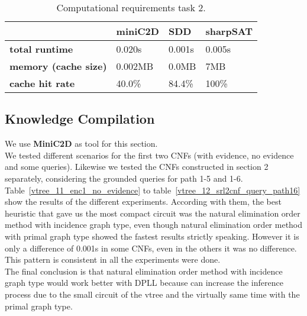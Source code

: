 \begin{table}[h]
	\centering
	\caption{Computational requirements task 2.}
	\label{table:comptask2}
	\begin{tabular}{l|l|l|l}
		\textbf{}        & \textbf{miniC2D} & \textbf{SDD} & \textbf{sharpSAT} \\ \hline
		\textbf{total runtime} &  0.020s  &   0.001s   &   0.005s  \\ \hline
		\textbf{memory (cache size)}  &  0.002MB  &   0.0MB &   7MB  \\ \hline
		\textbf{cache hit rate}  & 40.0\%  & 84.4\% &   100\%
	\end{tabular}
\end{table}

\subsection{Knowledge Compilation}\label{subsec:knowledgecompilation}

We use \textbf{MiniC2D} as tool for this section.
\\[2ex]
We tested different scenarios for the first two CNFs (with evidence, no evidence and some queries). Likewise we tested the CNFs constructed in section 2 separately, considering the grounded queries for path 1-5 and 1-6.
\\[2ex]
Table~\ref{vtree_11_enc1_no_evidence} to table~\ref{vtree_12_srl2cnf_query_path16} show the results of the different experiments. According with them, the best heuristic that gave us the most compact circuit was the natural elimination order method with incidence graph type, even though natural elimination order method with primal graph type showed the fastest results strictly speaking. However it is only a difference of 0.001s in some CNFs, even in the others it was no difference. This pattern is consistent in all the experiments were done.
\\[2ex]
The final conclusion is that natural elimination order method with incidence graph type would work better with DPLL because can increase the inference process due to the small circuit of the vtree and the virtually same time with the primal graph type.










